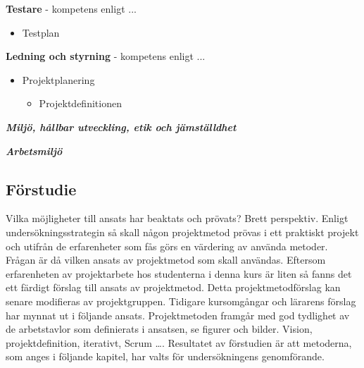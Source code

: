 \textbf{Testare} - kompetens enligt ...
\begin{itemize}
    \item Testplan
\end{itemize}

\textbf{Ledning och styrning} - kompetens enligt ...
\begin{itemize}
    \item Projektplanering
    \begin{itemize}
        \item Projektdefinitionen
    \end{itemize}
\end{itemize}

\textit{\textbf{Miljö, hållbar utveckling, etik och jämställdhet}}

\textit{\textbf{Arbetsmiljö}}

\subsection{Förstudie}
Vilka möjligheter till ansats har beaktats och prövats? Brett perspektiv.
Enligt undersökningsstrategin så skall någon projektmetod prövas i ett 
praktiskt projekt och utifrån de erfarenheter som fås görs en värdering
av använda metoder. Frågan är då vilken ansats av projektmetod som skall 
användas. Eftersom erfarenheten av projektarbete hos studenterna i denna 
kurs är liten så fanns det ett färdigt förslag till ansats av projektmetod. 
Detta projektmetodförslag kan senare modifieras av projektgruppen.
Tidigare kursomgångar och lärarens förslag har mynnat ut i följande ansats.
Projektmetoden framgår med god tydlighet av de arbetstavlor som definierats 
i ansatsen, se figurer och bilder.
Vision, projektdefinition, iterativt, Scrum ….
Resultatet av förstudien är att metoderna, som anges i följande kapitel,\cite{lundevall_rollen_nodate}
har valts för undersökningens genomförande.\\

